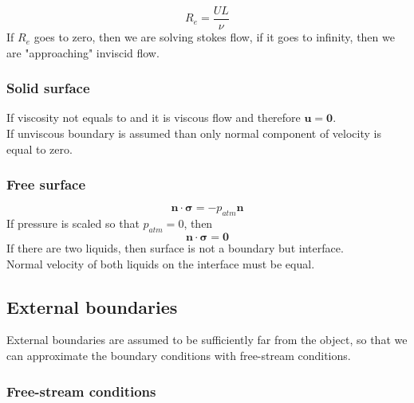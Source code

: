 \documentclass[a4paper,10pt]{book}
\begin{document}
    \begin{equation}
    R_e=\frac{UL}{\nu}
    \end{equation}
    If $R_e$ goes to zero, then we are solving stokes flow, if it goes to infinity, then we are "approaching" inviscid flow.

\subsubsection{Solid surface}

    If viscosity not equals to and it is viscous flow and therefore $\mathbf{u}=\mathbf{0}$.\\
    If unviscous boundary is assumed than only normal component of velocity is equal to zero.

\subsubsection{Free surface}

    \begin{equation}
    \mathbf{n}\cdot\boldsymbol{\sigma}=-p_{atm}\mathbf{n}
    \end{equation}
    If pressure is scaled so that $p_{atm}=0$, then
    \begin{equation}
    \mathbf{n}\cdot\boldsymbol{\sigma}=\mathbf{0}
    \end{equation}
    If there are two liquids, then surface is not a boundary but interface. \\
    Normal velocity of both liquids on the interface must be equal.

\subsection{External boundaries}

    External boundaries are assumed to be sufficiently far from the object, so that we can approximate the boundary conditions with free-stream conditions.

\subsubsection{Free-stream conditions}
\end{document}
